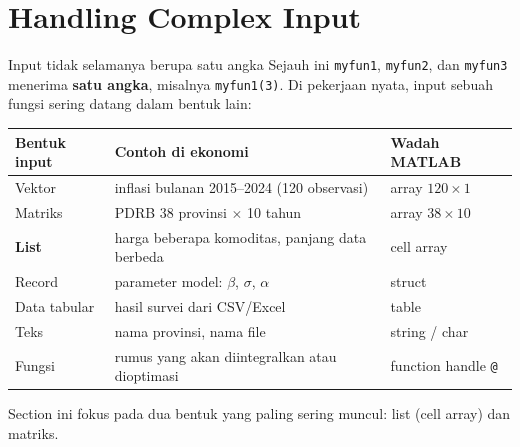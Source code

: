 \documentclass[aspectratio=169,11pt]{beamer}
\begin{document}
\section{Handling Complex Input}

\begin{frame}{Input tidak selamanya berupa satu angka}
\small
Sejauh ini \texttt{myfun1}, \texttt{myfun2}, dan \texttt{myfun3} menerima
\textbf{satu angka}, misalnya \texttt{myfun1(3)}. Di pekerjaan nyata, input
sebuah fungsi sering datang dalam \alert{bentuk lain}:

\vspace{0.4em}
\footnotesize
\renewcommand{\arraystretch}{1.18}
\centering
\begin{tabular}{l l l}
\toprule
Bentuk input & Contoh di ekonomi & Wadah MATLAB \\
\midrule
Vektor & inflasi bulanan 2015--2024 (120 observasi) & array $120\times1$ \\
Matriks & PDRB 38 provinsi $\times$ 10 tahun & array $38\times10$ \\
\textbf{List} & harga beberapa komoditas, panjang data berbeda & cell array \\
Record & parameter model: $\beta$, $\sigma$, $\alpha$ & struct \\
Data tabular & hasil survei dari CSV/Excel & table \\
Teks & nama provinsi, nama file & string / char \\
Fungsi & rumus yang akan diintegralkan atau dioptimasi & function handle \texttt{@} \\
\bottomrule
\end{tabular}

\vspace{0.5em}
\raggedright\small
Section ini fokus pada dua bentuk yang paling sering muncul:
\alert{list (cell array)} dan \alert{matriks}.
\end{frame}
\end{document}
